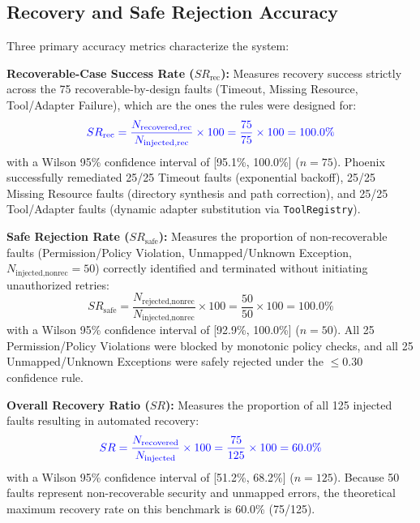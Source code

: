 \documentclass[conference]{IEEEtran}
\newcommand{\chg}[1]{{\color{blue}#1}}
\begin{document}
\subsection{Recovery and Safe Rejection Accuracy}
Three primary accuracy metrics characterize the system:

\textbf{Recoverable-Case Success Rate ($SR_{\text{rec}}$):} Measures recovery success strictly across the 75 recoverable-by-design faults (Timeout, Missing Resource, Tool/Adapter Failure), which are the ones the rules were designed for:
\begin{equation}
\chg{SR_{\text{rec}} = \frac{N_{\text{recovered,rec}}}{N_{\text{injected,rec}}} \times 100 = \frac{75}{75} \times 100 = 100.0\%}
\end{equation}
\chg{with a Wilson 95\% confidence interval of [95.1\%, 100.0\%] ($n=75$). Phoenix successfully remediated 25/25 Timeout faults (exponential backoff), 25/25 Missing Resource faults (directory synthesis and path correction), and 25/25 Tool/Adapter faults (dynamic adapter substitution via \texttt{ToolRegistry}).}

\textbf{Safe Rejection Rate ($SR_{\text{safe}}$):} Measures the proportion of non-recoverable faults (Permission/Policy Violation, Unmapped/Unknown Exception, $N_{\text{injected,nonrec}} = 50$) correctly identified and terminated without initiating unauthorized retries:
\begin{equation}
SR_{\text{safe}} = \frac{N_{\text{rejected,nonrec}}}{N_{\text{injected,nonrec}}} \times 100 = \frac{50}{50} \times 100 = 100.0\%
\end{equation}
with a Wilson 95\% confidence interval of [92.9\%, 100.0\%] ($n=50$). All 25 Permission/Policy Violations were blocked by monotonic policy checks, and all 25 Unmapped/Unknown Exceptions were safely rejected under the $\le 0.30$ confidence rule.

\textbf{Overall Recovery Ratio ($SR$):} Measures the proportion of all 125 injected faults resulting in automated recovery:
\begin{equation}
\chg{SR = \frac{N_{\text{recovered}}}{N_{\text{injected}}} \times 100 = \frac{75}{125} \times 100 = 60.0\%}
\end{equation}
\chg{with a Wilson 95\% confidence interval of [51.2\%, 68.2\%] ($n=125$). Because 50 faults represent non-recoverable security and unmapped errors, the theoretical maximum recovery rate on this benchmark is 60.0\% (75/125).}
\end{document}
